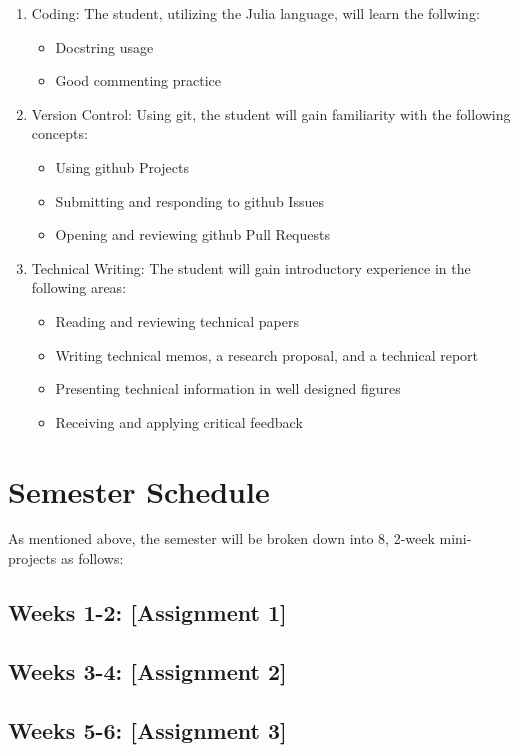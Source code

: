 \documentclass[12pt]{article}
\begin{document}
\begin{enumerate}
	\item Coding: The student, utilizing the Julia language, will learn the follwing:
	\begin{itemize}
		\item Docstring usage
		\item Good commenting practice
	\end{itemize}
	\item Version Control: Using git, the student will gain familiarity with the following concepts:
	\begin{itemize}
		\item Using github Projects
		\item Submitting and responding to github Issues
		\item Opening and reviewing github Pull Requests
	\end{itemize}
	\item Technical Writing: The student will gain introductory experience in the following areas:
	\begin{itemize}
		\item Reading and reviewing technical papers
		\item Writing technical memos, a research proposal, and a technical report
		\item Presenting technical information in well designed figures
		\item Receiving and applying critical feedback
	\end{itemize}
\end{enumerate}

\section*{Semester Schedule}

As mentioned above, the semester will be broken down into 8, 2-week mini-projects as follows:

\subsection*{Weeks 1-2: [Assignment 1]}

\subsection*{Weeks 3-4: [Assignment 2]}

\subsection*{Weeks 5-6: [Assignment 3]}
\end{document}
